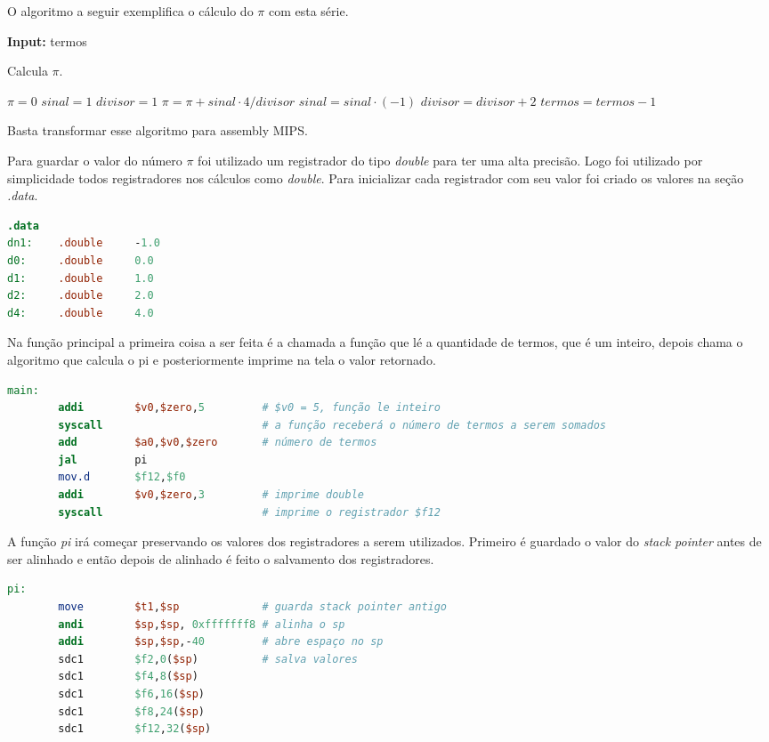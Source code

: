 \documentclass[12pt]{article}
\begin{document}
O algoritmo a seguir exemplifica o cálculo do \(\pi\) com esta série.
\begin{algorithm}
\textbf{Input:} termos
\caption{Calcula $\pi$.}\label{alg:maxSubSquareGreedy}
\begin{algorithmic}[1]
\State $\pi=0$
\State $sinal=1$
\State $divisor=1$
\State $\pi=\pi +sinal\cdot 4/divisor$
\State $sinal=sinal\cdot (-1)$
\State $divisor=divisor + 2$
\State $termos=termos-1$
\EndWhile
\EndProcedure
\end{algorithmic}
\end{algorithm}

Basta transformar esse algoritmo para assembly MIPS.

Para guardar o valor do número \(\pi\) foi utilizado um registrador do tipo \emph{double} para ter uma alta precisão. Logo foi utilizado por simplicidade todos registradores nos cálculos como \emph{double}. Para inicializar cada registrador com seu valor foi criado os valores na seção \emph{.data}.

\begin{lstlisting}[language = mips]
        .data
dn1:    .double     -1.0
d0:     .double     0.0
d1:     .double     1.0
d2:     .double     2.0
d4:     .double     4.0
\end{lstlisting}

Na função principal a primeira coisa a ser feita é a chamada a função que lé a quantidade de termos, que é um inteiro, depois chama o algoritmo que calcula o pi e posteriormente imprime na tela o valor retornado.

\begin{lstlisting}[language = mips]
main:
        addi        $v0,$zero,5         # $v0 = 5, função le inteiro
        syscall                         # a função receberá o número de termos a serem somados
        add         $a0,$v0,$zero       # número de termos
        jal         pi
        mov.d       $f12,$f0
        addi        $v0,$zero,3         # imprime double
        syscall                         # imprime o registrador $f12
\end{lstlisting}

A função \emph{pi} irá começar preservando os valores dos registradores a serem utilizados. Primeiro é guardado o valor do \emph{stack pointer} antes de ser alinhado e então depois de alinhado é feito o salvamento dos registradores.

\begin{lstlisting}[language = mips]
pi:
        move        $t1,$sp             # guarda stack pointer antigo
        andi        $sp,$sp, 0xfffffff8 # alinha o sp
        addi        $sp,$sp,-40         # abre espaço no sp
        sdc1        $f2,0($sp)          # salva valores
        sdc1        $f4,8($sp)
        sdc1        $f6,16($sp)
        sdc1        $f8,24($sp)
        sdc1        $f12,32($sp)
\end{lstlisting}
\end{document}
